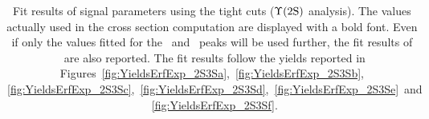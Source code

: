 \begin{table}[hbtp]
\begin{centering}
\begin{tabular}{c|c|c|c|c|c}
      \hline
    \end{tabular}

    \caption{Fit results of signal parameters using the tight cuts
      ($\Upsilon\mathrm{(2S)}$ analysis). The values actually used in the cross
      section computation are displayed with a bold font. Even if only
      the values fitted for the \PgUb\ and \PgUc\ peaks will be used further, the
      fit results of \PgUa\ are also reported. The fit
      results follow the yields reported in
      Figures~\ref{fig:YieldsErfExp_2S3Sa},~\ref{fig:YieldsErfExp_2S3Sb},
      ~\ref{fig:YieldsErfExp_2S3Sc},~\ref{fig:YieldsErfExp_2S3Sd},~\ref{fig:YieldsErfExp_2S3Se}~and
      ~\ref{fig:YieldsErfExp_2S3Sf}.} 
    \label{tab:YieldsTight}
  \end{centering}
\end{table}
% 

